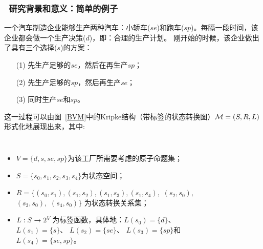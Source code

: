 \documentclass[9pt, CJK]{beamer}
\begin{document}
	\begin{frame}
		\frametitle{~研究背景和意义：{\small 简单的例子}}
		{\scriptsize \begin{example}[汽车制造企业模型]\label{car_manufacturing}
				
				一个汽车制造企业能够生产两种汽车：小轿车($se$)和跑车($sp$)。每隔一段时间，该企业都会做一个生产决策($d$)，即：合理的生产计划。
				刚开始的时候，该企业做出了具有三个选择($s$)的方案：
				\begin{itemize}
					\item[(1)] 先生产足够的$se$，然后在再生产$sp$；
					\item[(2)] 先生产足够的$sp$，然后再生产$se$；
					\item[(3)] 同时生产$se$和$sp$。
				\end{itemize}
				这一过程可以由图~\ref{BVM}中的Kripke结构（带标签的状态转换图）${\cal M}=(S,R,L)$形式化地展现出来，其中:
				\begin{columns}
					\begin{itemize}
						\item $V=\{d,s, se, sp\}$为该工厂所需要考虑的原子命题集；
						\item $S=\{s_0,s_1,s_2,s_3,s_4\}$为状态空间；
						\item $R = \{(s_0, s_1), (s_1,s_2), (s_1,s_3), (s_1,s_4),
						$ $(s_2,s_0),$ $(s_3,s_0),$ $(s_4,s_0)\}$ 为状态转换关系集；
						\item $L: S \rightarrow 2^V$为标签函数，具体地：$L(s_0) = \{d\}$、$L(s_1) = \{s\}$、 $L(s_2)=\{se\}$、 $L(s_3) = \{sp\}$和$L(s_4) = \{se,sp\}$。
					\end{itemize}
					\begin{figure}
						\centering
\end{figure}
\end{columns}
\end{example}}
\end{frame}
\end{document}
